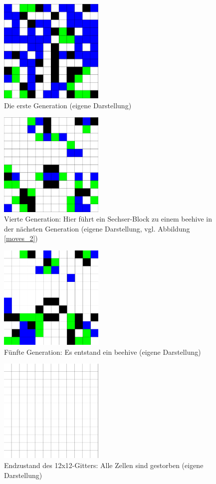 \documentclass[../mciAusarbeitung.tex]{subfiles}
\begin{document}
\begin{figure}[H]
\includegraphics[width=5cm]{img/12x12_firstgen.png}
\caption{Die erste Generation (eigene Darstellung)}
\label{12x12_firstgen}
\end{figure}

\begin{figure}[H]
\includegraphics[width=5cm]{img/12x12_gen4.png}
\caption[Vierte Generation: Sechser Block]{Vierte Generation: Hier führt ein Sechser-Block zu einem beehive in der nächsten Generation (eigene Darstellung, vgl. Abbildung \ref{moves_2})}
\label{12x12_gen4}
\end{figure}

\begin{figure}[H]
\includegraphics[width=5cm]{img/12x12_beehive_gen5.png}
\caption{Fünfte Generation: Es entstand ein beehive (eigene Darstellung)}
\label{12x12_beehive_gen5}
\end{figure}

\begin{figure}[H]
\includegraphics[width=5cm]{img/12x12_empty_gen45.png}
\caption{Endzustand des 12x12-Gitters: Alle Zellen sind gestorben (eigene Darstellung)}
\label{12x12_empty_gen45}
\end{figure}
\end{document}
